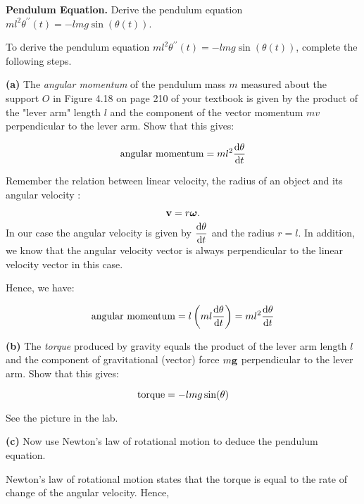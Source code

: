 \documentclass[11pt]{article}
\begin{document}
\begin{problem}
{\bf Pendulum Equation.} Derive the pendulum equation $ m l^2 \theta^{\prime \prime}(t) = -l m g \sin(\theta(t))$.
\end{problem}

\begin{solution}
To derive the pendulum equation $ m l^2 \theta^{\prime \prime}(t) = -l m g \sin(\theta(t))$, complete the following steps.

{\bf (a)} The \textit{angular momentum} of the pendulum mass $m$ measured about the support $O$ in Figure 4.18 on page 210 of your textbook is given by the product of the "lever arm" length $l$ and the component of the vector momentum $mv$ perpendicular to the lever arm. Show that this gives:

\begin{equation*}
{\rm angular \, \, momentum} = ml^2 \dfrac{{\rm d} \theta}{{\rm d} t}
\end{equation*}

Remember the relation between linear velocity, the radius of an object and its angular velocity :

\begin{equation*}
{\bf v} = r \boldsymbol \omega.
\end{equation*}
In our case the angular velocity is given by $\dfrac{{\rm d} \theta}{{\rm d} t}$ and the radius $r=l$. In addition, we know that the angular velocity vector is always perpendicular to the linear velocity vector in this case.

Hence, we have:

\begin{equation*}
{\rm angular \, \, momentum} =  l \left(ml\dfrac{{\rm d} \theta}{{\rm d} t}\right) =  ml^2 \dfrac{{\rm d} \theta}{{\rm d} t}
\end{equation*}

{\bf (b)} The \textit{torque} produced by gravity equals the product of the lever arm length $l$ and the component of gravitational (vector) force $m {\bf g}$ perpendicular to the lever arm. Show that this gives:

\begin{equation*}
{\rm torque} = -lmg\sin(\theta)
\end{equation*}

See the picture in the lab.

{\bf (c)} Now use Newton's law of rotational motion to deduce the pendulum equation.

Newton's law of rotational motion states that the torque is equal to the rate of change of the angular velocity. Hence,


\end{solution}
\end{document}
